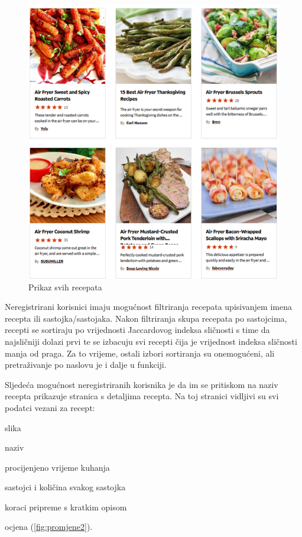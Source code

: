 \begin{figure}[H]
	\includegraphics[scale=0.8]{slike/Slika1.PNG} %
	\centering
	\caption{Prikaz svih recepata}
	\label{fig:promjene}
\end{figure}
Neregistrirani korisnici imaju mogućnost filtriranja recepata upisivanjem imena recepta ili sastojka/sastojaka. Nakon filtriranja skupa recepata po sastojcima, recepti se sortiraju po vrijednosti Jaccardovog indeksa sličnosti s time da najsličniji dolazi prvi te se izbacuju svi recepti čija je vrijednost indeksa sličnosti manja od praga. Za to vrijeme, ostali izbori sortiranja su onemogućeni, ali pretraživanje po naslovu je i dalje u funkciji.

Sljedeća mogućnost neregistriranih korisnika je da im se pritiskom na naziv recepta prikazuje stranica s detaljima recepta. Na toj stranici vidljivi su svi podatci vezani za recept:

\begin{packed_item}
	\item slika
	\item naziv
	\item procijenjeno vrijeme kuhanja
	\item sastojci i količina svakog sastojka
	\item koraci pripreme s kratkim opisom
	\item ocjena (\ref{fig:promjene2}).
\end{packed_item}

